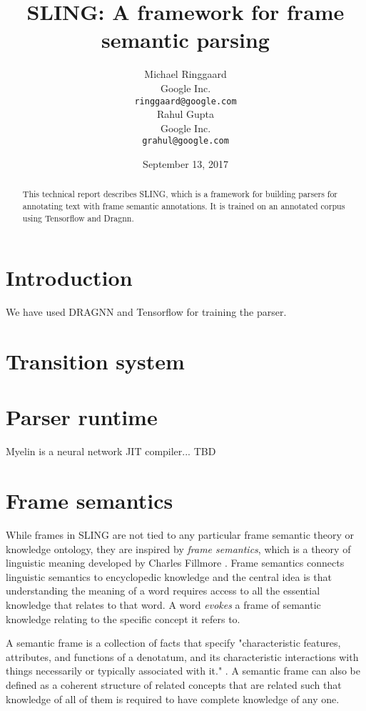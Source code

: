 \documentclass[11pt,a4paper]{article}
\title{SLING: A framework for frame semantic parsing}
\author{
Michael Ringgaard \\ Google Inc. \\ {\tt ringgaard@google.com} \\\And
Rahul Gupta \\ Google Inc. \\ {\tt grahul@google.com} \\
}
\date{September 13, 2017}
\begin{document}
\maketitle

\begin{abstract}
This technical report describes SLING, which is a framework for building
parsers for annotating text with frame semantic annotations. It is
trained on an annotated corpus using Tensorflow and Dragnn.
\end{abstract}

\section{Introduction}
We have used DRAGNN \cite{dragnn} and Tensorflow \cite{tensorflow} for training the
parser.

\section{Transition system}

\section{Parser runtime}

Myelin is a neural network JIT compiler... TBD

\section{Frame semantics}

While frames in SLING are not tied to any particular frame semantic theory or
knowledge ontology, they are inspired by \emph{frame semantics}, which is a
theory of linguistic meaning developed by Charles Fillmore \cite{fillmore1982}.
Frame semantics connects linguistic semantics to encyclopedic knowledge and the
central idea is that understanding the meaning of a word requires access to all
the essential knowledge that relates to that word. A word \emph{evokes} a frame
of semantic knowledge relating to the specific concept it refers to.

A semantic frame is a collection of facts that specify "characteristic
features, attributes, and functions of a denotatum, and its characteristic
interactions with things necessarily or typically associated with it." \cite{alan2001}.
A semantic frame can also be defined as a coherent structure of related concepts
that are related such that knowledge of all of them is required to have
complete knowledge of any one.
\end{document}
